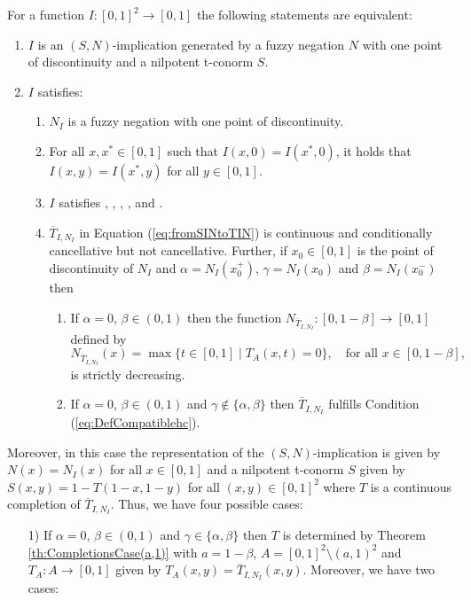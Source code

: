 \begin{proposition}\label{prop:characterization(S,N)_nilpotent}
	For a function $I:[0,1]^2 \to [0,1]$ the following statements are equivalent:
	\begin{enumerate}[label=(\roman*)]
		\item $I$ is an $(S,N)$-implication  generated by a fuzzy negation $N$ with one point of discontinuity and a nilpotent t-conorm $S$.
		\item $I$ satisfies:
		\begin{enumerate}
			\item $N_I$ is a fuzzy negation with one point of discontinuity.
			\item For all $x,x^*\in[0,1]$ such that $I(x,0)=I(x^*,0)$, it holds that $I(x,y)=I(x^*,y)$ for all $y\in[0,1]$.
			\item $I$ satisfies \Ione, \Itwo, \NP, \EP, \Rone and \Rtwo.
			\item $\overline{T}_{I,N_I}$ in Equation (\ref{eq:fromSINtoTIN}) is continuous and conditionally cancellative but not cancellative. Further, if $x_0 \in [0,1]$ is the point of discontinuity of $N_I$ and $\alpha=N_I(x_0^{+})$, $\gamma=N_I(x_0)$ and $\beta=N_I(x_0^{-})$ then
			\begin{enumerate}[label=(\arabic*)]
				\item If $\alpha=0$, $\beta \in (0,1)$ then the function $N_{\overline{T}_{I,N_I}}: [0,1-\beta] \to [0,1]$ defined by
				$$ N_{\overline{T}_{I,N_I}}(x)= \max \{ t \in [0,1] \mid T_A(x,t)=0\}, \quad \text{for all } x \in [0,1-\beta],$$
				 is strictly decreasing.
				\item If $\alpha=0$, $\beta \in (0,1)$ and $\gamma \not \in \{\alpha, \beta\}$ then $\overline{T}_{I,N_I}$ fulfills Condition (\ref{eq:DefCompatiblehc}).
			\end{enumerate}
		\end{enumerate}
	\end{enumerate}
	Moreover, in this case the representation of the $(S,N)$-implication is given by $N(x)=N_I(x)$ for all $x \in [0,1]$ and a nilpotent t-conorm $S$ given by $S(x,y)=1-T(1-x,1-y)$ for all $(x,y) \in [0,1]^2$ where $T$ is a continuous completion of $\overline{T}_{I,N_I}$. Thus, we have four possible cases:
	\begin{enumerate}
		\item[1)] If $\alpha=0$, $\beta \in(0,1)$ and $\gamma \in \{\alpha, \beta\}$ then $T$ is determined by Theorem \ref{th:CompletionsCase(a,1)} with $a=1-\beta$, $A=[0,1]^2 \setminus (a,1)^2$ and $T_A : A \to [0,1]$ given by $T_A(x,y)=\overline{T}_{I,N_I}(x,y)$. Moreover, we have two cases:

\end{enumerate}
\end{proposition}
